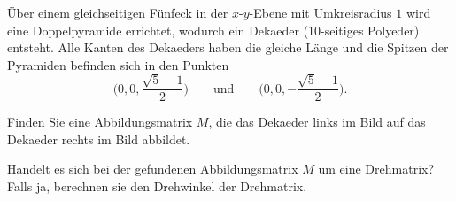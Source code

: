 Über einem gleichseitigen Fünfeck in der $x$-$y$-Ebene mit Umkreisradius $1$ 
wird eine Doppelpyramide errichtet, wodurch ein Dekaeder (10-seitiges Polyeder) entsteht.
Alle Kanten des Dekaeders haben die gleiche Länge und die Spitzen der Pyramiden befinden sich
in den Punkten 
\[
\biggl(0,0,\frac{\sqrt{5}-1}{2}\biggr)
\qquad\text{und}\qquad
\biggl(0,0,-\frac{\sqrt{5}-1}{2}\biggr).
\]

\begin{center}
\end{center}

\begin{teilaufgaben}
\item
Finden Sie eine Abbildungsmatrix $M$, die das Dekaeder links im Bild auf das
Dekaeder rechts im Bild abbildet.
\item
Handelt es sich bei der gefundenen Abbildungsmatrix $M$ um eine Drehmatrix?
Falls ja, berechnen sie den Drehwinkel der Drehmatrix.
\end{teilaufgaben}

\begin{hinweis}
\end{hinweis}


